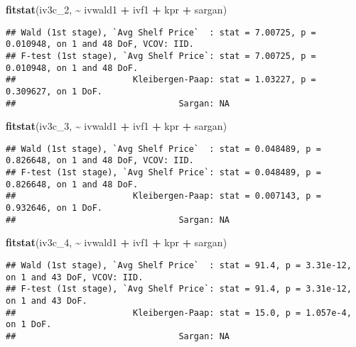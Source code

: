 \documentclass[
]{article}
\newenvironment{Shaded}{\begin{snugshade}}{\end{snugshade}}
\newcommand{\FunctionTok}[1]{\textcolor[rgb]{0.13,0.29,0.53}{\textbf{#1}}}
\newcommand{\NormalTok}[1]{#1}
\newcommand{\SpecialCharTok}[1]{\textcolor[rgb]{0.81,0.36,0.00}{\textbf{#1}}}
\begin{document}
\begin{Shaded}
\begin{Highlighting}[]
\FunctionTok{fitstat}\NormalTok{(iv3c\_2, }\SpecialCharTok{\textasciitilde{}}\NormalTok{ ivwald1 }\SpecialCharTok{+}\NormalTok{ ivf1 }\SpecialCharTok{+}\NormalTok{ kpr }\SpecialCharTok{+}\NormalTok{ sargan)}
\end{Highlighting}
\end{Shaded}

\begin{verbatim}
## Wald (1st stage), `Avg Shelf Price`  : stat = 7.00725, p = 0.010948, on 1 and 48 DoF, VCOV: IID.
## F-test (1st stage), `Avg Shelf Price`: stat = 7.00725, p = 0.010948, on 1 and 48 DoF.
##                       Kleibergen-Paap: stat = 1.03227, p = 0.309627, on 1 DoF.
##                                Sargan: NA
\end{verbatim}

\begin{Shaded}
\begin{Highlighting}[]
\FunctionTok{fitstat}\NormalTok{(iv3c\_3, }\SpecialCharTok{\textasciitilde{}}\NormalTok{ ivwald1 }\SpecialCharTok{+}\NormalTok{ ivf1 }\SpecialCharTok{+}\NormalTok{ kpr }\SpecialCharTok{+}\NormalTok{ sargan)}
\end{Highlighting}
\end{Shaded}

\begin{verbatim}
## Wald (1st stage), `Avg Shelf Price`  : stat = 0.048489, p = 0.826648, on 1 and 48 DoF, VCOV: IID.
## F-test (1st stage), `Avg Shelf Price`: stat = 0.048489, p = 0.826648, on 1 and 48 DoF.
##                       Kleibergen-Paap: stat = 0.007143, p = 0.932646, on 1 DoF.
##                                Sargan: NA
\end{verbatim}

\begin{Shaded}
\begin{Highlighting}[]
\FunctionTok{fitstat}\NormalTok{(iv3c\_4, }\SpecialCharTok{\textasciitilde{}}\NormalTok{ ivwald1 }\SpecialCharTok{+}\NormalTok{ ivf1 }\SpecialCharTok{+}\NormalTok{ kpr }\SpecialCharTok{+}\NormalTok{ sargan)}
\end{Highlighting}
\end{Shaded}

\begin{verbatim}
## Wald (1st stage), `Avg Shelf Price`  : stat = 91.4, p = 3.31e-12, on 1 and 43 DoF, VCOV: IID.
## F-test (1st stage), `Avg Shelf Price`: stat = 91.4, p = 3.31e-12, on 1 and 43 DoF.
##                       Kleibergen-Paap: stat = 15.0, p = 1.057e-4, on 1 DoF.
##                                Sargan: NA
\end{verbatim}
\end{document}
